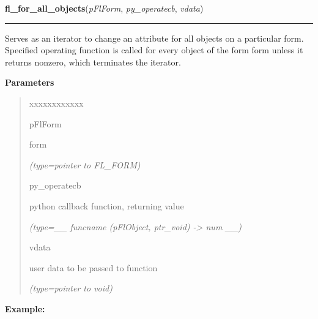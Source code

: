     \label{xformslib:flbasic:fl_for_all_objects}

    \vspace{0.5ex}

\hspace{.8\funcindent}\begin{boxedminipage}{\funcwidth}

    \raggedright \textbf{fl\_for\_all\_objects}(\textit{pFlForm}, \textit{py\_operatecb}, \textit{vdata})

    \vspace{-1.5ex}

    \rule{\textwidth}{0.5\fboxrule}
\setlength{\parskip}{2ex}
    Serves as an iterator to change an attribute for all objects on a 
    particular form. Specified operating function is called for every 
    object of the form form unless it returns nonzero, which terminates the
    iterator.

\setlength{\parskip}{1ex}
      \textbf{Parameters}
      \vspace{-1ex}

      \begin{quote}
        \begin{Ventry}{xxxxxxxxxxxx}

          \item[pFlForm]

          form

            {\it (type=pointer to FL\_FORM)}

          \item[py\_operatecb]

          python callback function, returning value

            {\it (type=\_\_ funcname (pFlObject, ptr\_void) -{\textgreater} num \_\_)}

          \item[vdata]

          user data to be passed to function

            {\it (type=pointer to void)}

        \end{Ventry}

      \end{quote}

\textbf{Example:}
\begin{quote}
  \begin{itemize}


\end{itemize}
\end{quote}
\end{boxedminipage}
